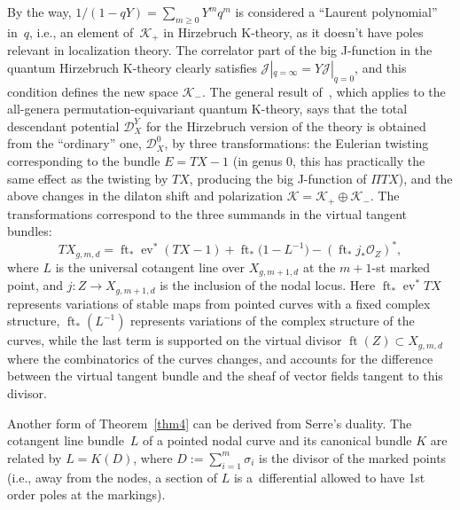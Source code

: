 \documentclass[10pt,a4paper]{amsart}
\numberwithin{equation}{section}
\def\D{\mathcal D}
\def\K{\mathcal K}
\def\J{\mathcal J}
\def\O{\mathcal O}
\def\ev{\operatorname{ev}}
\def\ft{\operatorname{ft}}
\theoremstyle{definition}
\theoremstyle{plain}
\begin{document}
\begin{Remark}\label{rmk5}
By the way, $1/(1-qY)=\sum_{m\geq 0} Y^mq^m$ is considered a ``Laurent polynomial'' in~$q$, i.e., an element of~$\K_{+}$ in Hirzebruch K-theory, as it doesn't have poles relevant in localization theory. The correlator part of the big J-function in the quantum Hirzebruch K-theory clearly satisfies $\J|_{q=\infty}=Y\J|_{q=0}$, and this condition defines the new space $\K_{-}$. The general result of~\cite{G-H}, which applies to the all-genera permutation-equivariant quantum K-theory, says that the total descendant potential $\D_X^Y$ for the Hirzebruch version of the theory is obtained from the ``ordinary'' one, $\D_X^0$, by three transformations: the Eulerian twisting corresponding to the bundle $E=TX-1$ (in genus $0$, this has practically the same effect as the twisting by $TX$, producing the big J-function of $\Pi T X$), and the above changes in the dilaton shift and polarization \mbox{$\K=\K_{+}\oplus \K_{-}$}. The transformations correspond to the three summands in the virtual tangent bundles:
\[
TX_{g,m,d}=\ft_*\ev^*(TX-1)+\ft_*\big(1-L^{-1}\big)-(\ft_*j_*\O_Z)^*,
\]
where $L$ is the universal cotangent line over $X_{g,m+1,d}$ at the $m+1$-st marked point, and $j\colon Z\to X_{g,m+1,d}$ is the inclusion of the nodal locus. Here $\ft_*\ev^*TX$ represents variations of stable maps from pointed curves with a fixed complex structure, $\ft_*(L^{-1})$ represents variations of the complex structure of the curves, while the last term is supported on the virtual divisor $\ft(Z)\subset X_{g,m,d}$ where the combinatorics of the curves changes, and accounts for the difference between the virtual tangent bundle and the sheaf of vector fields tangent to this divisor.
\end{Remark}

Another form of Theorem~\ref{thm4} can be derived from Serre's duality. The cotangent line bundle~$L$ of a pointed nodal curve and its canonical bundle $K$ are related by $L=K(D)$, where $D:=\sum_{i=1}^m\sigma_i$ is the divisor of the marked points (i.e., away from the nodes, a section of $L$ is a~differential allowed to have 1st order poles at the markings).
\end{document}
